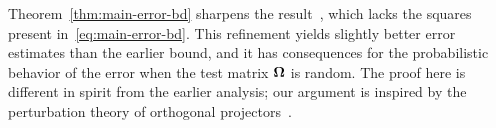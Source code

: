\documentclass[final]{siamltex}
\begin{document}
\lsp

Theorem~\ref{thm:main-error-bd} sharpens the result~\cite[Lem.~2]{BMD09:Improved-Approximation}, which lacks the squares present in~\eqref{eq:main-error-bd}.  This refinement yields slightly better error estimates than the earlier bound, and it has consequences for the probabilistic behavior of the error when the test matrix $\bm{\Omega}$ is random.  The proof here is different in spirit from the earlier analysis; our argument is inspired by the perturbation theory of orthogonal projectors~\cite{Ste77:Perturbation-Pseudoinverse}.

%



\lsp
\end{document}
